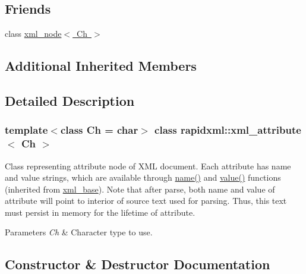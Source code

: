 \subsection*{Friends}
\begin{DoxyCompactItemize}
\item 
class \mbox{\hyperlink{classrapidxml_1_1xml__attribute_aa7e464ce3fe512598ff8dda47291941f}{xml\+\_\+node$<$ Ch $>$}}
\end{DoxyCompactItemize}
\subsection*{Additional Inherited Members}


\subsection{Detailed Description}
\subsubsection*{template$<$class Ch = char$>$\newline
class rapidxml\+::xml\+\_\+attribute$<$ Ch $>$}

Class representing attribute node of X\+ML document. Each attribute has name and value strings, which are available through \mbox{\hyperlink{classrapidxml_1_1xml__base_aef8ae147fbee59209f714274afc80dc4}{name()}} and \mbox{\hyperlink{classrapidxml_1_1xml__base_a6af65de5e59ac497cd69838f8a89d602}{value()}} functions (inherited from \mbox{\hyperlink{classrapidxml_1_1xml__base}{xml\+\_\+base}}). Note that after parse, both name and value of attribute will point to interior of source text used for parsing. Thus, this text must persist in memory for the lifetime of attribute. 
\begin{DoxyParams}{Parameters}
{\em Ch} & Character type to use. \\
\hline
\end{DoxyParams}


\subsection{Constructor \& Destructor Documentation}
\mbox{\label{classrapidxml_1_1xml__attribute_a26be291103917d3e8de110d46dd83816}} 
